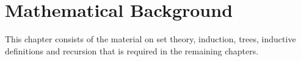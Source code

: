 \chapter{Mathematical Background}
\label{MathematicalBackground}

This chapter consists of the material on set theory, induction, trees,
inductive definitions and recursion that is required in the remaining
chapters.


%
%
